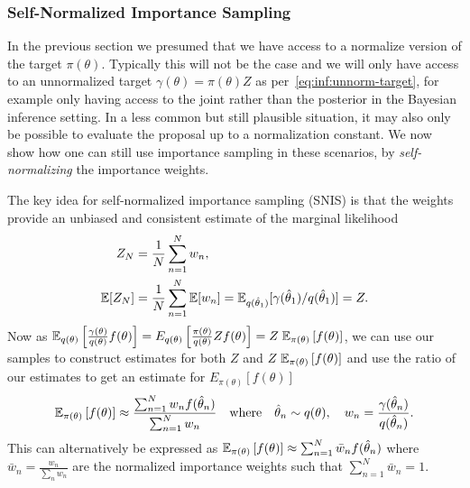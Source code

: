 \subsubsection{Self-Normalized Importance Sampling}
\label{sec:inf:foundation:importance:self-norm}

In the previous section we presumed that we have access to a normalize version of the target
$\pi(\theta)$.  Typically this will not be the case and we will only have access to an
unnormalized target $\gamma(\theta)=\pi(\theta)Z$ as per~\eqref{eq:inf:unnorm-target},
for example only having access to the joint rather than the posterior in the Bayesian inference setting.
In a less common but still plausible situation, it may also only be possible to evaluate the proposal
up to a normalization constant.
We now show how one can still use importance sampling in these scenarios, by
\emph{self-normalizing} the importance weights.

The key idea for self-normalized importance sampling (SNIS) is that the weights provide
an unbiased and consistent estimate of the marginal likelihood
\begin{align}
Z_N &= \frac{1}{N} \sum_{n=1}^{N} w_n, \\
\mathbb{E} [Z_N] &= \frac{1}{N} \sum_{n=1}^{N} \mathbb{E}[w_n] =\mathbb{E}_{q(\hat{\theta}_1)}[\gamma(\hat{\theta}_1)/q(\hat{\theta}_1)] = Z.
\end{align}
Now as $\mathbb{E}_{q(\theta)}\left[\frac{\gamma(\theta)}{q(\theta)}f(\theta)\right]=
E_{q(\theta)}\left[\frac{\pi(\theta)}{q(\theta)} Zf(\theta)\right]=Z\;\mathbb{E}_{\pi(\theta)} \left[f(\theta)\right]$, we can 
use our samples to construct \mc estimates for both $Z$ and $Z\;\mathbb{E}_{\pi(\theta)} \left[f(\theta)\right]$ and use the ratio
of our estimates to get an estimate for $E_{\pi(\theta)} \left[f(\theta)\right]$
\begin{align}
\label{eq:inf:snis}
\mathbb{E}_{\pi(\theta)} \left[f(\theta)\right] \approx \frac{\sum_{n=1}^{N} w_n f(\hat{\theta}_n)}{\sum_{n=1}^{N} w_n}
\quad \mathrm{where} \quad \hat{\theta}_n \sim q(\theta), \quad w_n = \frac{\gamma(\hat{\theta}_n)}{q(\hat{\theta}_n)}.
\end{align} 
This can alternatively be expressed as
$\mathbb{E}_{\pi(\theta)} \left[f(\theta)\right] \approx \sum_{n=1}^{N} \bar{w}_n f(\hat{\theta}_n)$
where $\bar{w}_n = \frac{w_n}{\sum_{n} w_n}$ are the normalized importance 
weights such that $\sum_{n=1}^N\bar{w}_n = 1$.  

